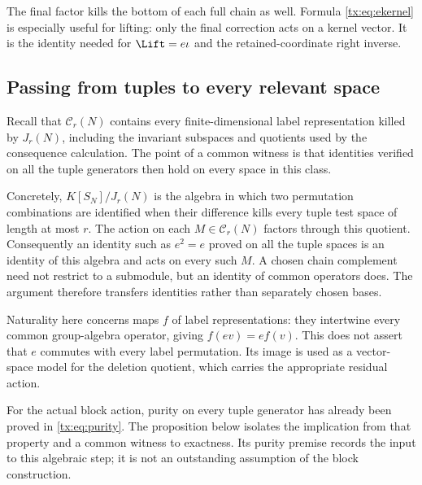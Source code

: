 \documentclass[11pt,a4paper,oneside,openany]{book}
\theoremstyle{definition}\newtheorem{definition}[theorem]{Definition}
\theoremstyle{remark}\newtheorem{remark}[theorem]{Remark}
\numberwithin{equation}{chapter}
\begin{document}
The final factor kills the bottom of each full chain as well.
Formula \eqref{tx:eq:ekernel} is especially useful for lifting:
only the final correction acts on a kernel vector. It is the identity needed for
$\Lift=e\iota$ and the retained-coordinate right inverse.

\subsection{Passing from tuples to every relevant space}
Recall that $\mathcal C_r(N)$ contains every finite-dimensional
label representation killed by $J_r(N)$, including the invariant
subspaces and quotients used by the consequence calculation. The
point of a common witness is that identities verified on all the
tuple generators then hold on every space in this class.

Concretely, $K[S_N]/J_r(N)$ is the algebra in which two permutation
combinations are identified when their difference kills every tuple
test space of length at most $r$. The action on each $M\in\mathcal C_r(N)$ factors
through this quotient. Consequently an identity such as $e^2=e$
proved on all the tuple spaces is an identity of this algebra and
acts on every such $M$. A chosen chain complement need not restrict
to a submodule, but an identity of common operators does. The argument
therefore transfers identities rather than separately chosen bases.

Naturality here concerns maps $f$ of label representations: they
intertwine every common group-algebra operator, giving
$f(ev)=e f(v)$. This does not assert that $e$ commutes with every
label permutation. Its image is used as a vector-space model for
the deletion quotient, which carries the appropriate residual action.

For the actual block action, purity on every tuple generator has
already been proved in \eqref{tx:eq:purity}. The proposition below
isolates the implication from that property and a common witness to
exactness. Its purity premise records the input to this algebraic
step; it is not an outstanding assumption of the block construction.
\end{document}
